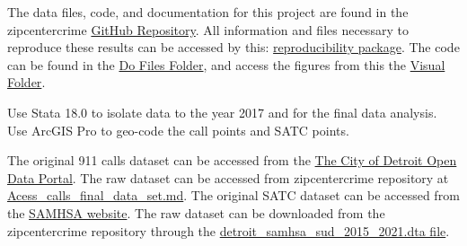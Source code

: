\documentclass[12pt]{article}
\begin{document}
The data files, code, and documentation for this project are found in the zipcentercrime \href{https://github.com/ecn310/course-project-zipcentercrime}{GitHub Repository}. All information and files necessary to reproduce these results can be accessed by this: \href{https://github.com/ecn310/course-project-zipcentercrime/tree/main/Reproducibility%20Package}{reproducibility package}. The code can be found in the \href{https://github.com/ecn310/course-project-zipcentercrime/tree/main/Reproducibility%20Package/Do%20files}{Do Files Folder}, and access the figures from this the \href{https://github.com/ecn310/course-project-zipcentercrime/tree/main/Reproducibility%20Package/Visual%20Graphics}{Visual Folder}. 

Use Stata 18.0 to isolate data to the year 2017 and for the final data analysis. Use ArcGIS Pro to geo-code the call points and SATC points. 

The original 911 calls dataset can be accessed from the \href{https://data.detroitmi.gov}{The City of Detroit Open Data Portal}. The raw dataset can be accessed from zipcentercrime repository at \href{https://github.com/ecn310/course-project-zipcentercrime/blob/main/Reproducibility%20Package/RawData/Acess_calls_final_data_set.md}{Acess\_calls\_final\_data\_set.md}. The original SATC dataset can be accessed from the \href{https://www.samhsa.gov}{SAMHSA website}. The raw dataset can be downloaded from the zipcentercrime repository through the \href{https://github.com/ecn310/course-project-zipcentercrime/blob/main/Reproducibility%20Package/RawData/detroit_samhsa_sud_2015_2021.dta}{detroit\_samhsa\_sud\_2015\_2021.dta file}.
\end{document}
